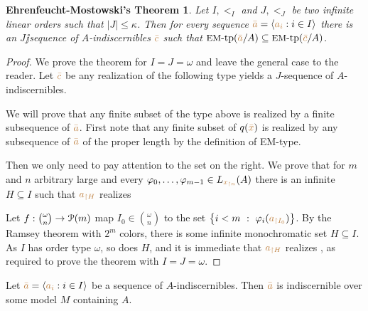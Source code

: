 \documentclass[creche.tex]{subfiles}
\begin{document}
\theoremstyle{mio}
\newtheorem{EhrenfeuchtMostowski}[thm]{Ehrenfeucht-Mostowski's Theorem}
\begin{EhrenfeuchtMostowski}\label{thm_EM}
  Let $I,<_I$ and $J,<_J$ be two infinite linear orders such that $|J|\le \kappa$. Then for every sequence ${\mr\bar a}=\<{\mr a_i}:i\in I\>$ there is an $J\jj$sequence of $A$-indiscernibles ${\mr\bar c}$ such that $\EMtp({\mr\bar a}/A)\subseteq\EMtp({\mr\bar c}/A)$.
\end{EhrenfeuchtMostowski}


\begin{proof}
  We prove the theorem for $I=J=\omega$ and leave the general case to the reader.
  Let ${\mr\bar c}$ be any realization of the following type yields a $J$-sequence of $A$-indiscernibles.


  We will prove that any finite subset of the type above is realized by a finite subsequence of ${\mr\bar a}$. First note that any finite subset of $q({\mr\bar x})$ is realized by any subsequence of ${\mr\bar a}$ of the proper length by the definition of EM-type.
  
  Then we only need to pay attention to the set on the right. We prove that for $m$ and $n$ arbitrary large and every $\phi_0,\dots,\phi_{m-1}\in L_{\mr x_{\restriction n}}(A)$ there is an infinite $H\subseteq I$ such that ${\mr a_{\restriction H}}$ realizes


  Let $f:{\omega\choose n}\to\P(m)$ map $I_0\in{\omega\choose n}$ to the set $\big\{i<m\ :\ \phi_i({\mr a_{\restriction I_0}})\big\}$. By the Ramsey theorem with $2^m$ colors, there is some infinite monochromatic set $H\subseteq I$. As $I$ has order type $\omega$, so does $H$, and it is immediate that ${\mr a_{\restriction H}}$ realizes \ssf{\#}, as required to prove the theorem with $I=J=\omega$.
\end{proof}


\begin{proposition}\label{prop_indiscernibles_set_model}
  Let ${\mr\bar a}=\<{\mr a_i}:i\in I\>$ be a sequence of $A$-indiscernibles. Then ${\mr\bar a}$ is indiscernible over some model $M$ containing $A$.
\end{proposition}
\end{document}
